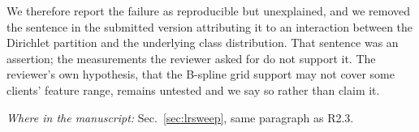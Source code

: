 \documentclass[11pt]{article}
\newcommand{\where}[1]{\par\smallskip\noindent\emph{Where in the manuscript:} #1\par}
\begin{document}
We therefore report the failure as reproducible but unexplained, and we removed the sentence in
the submitted version attributing it to an interaction between the Dirichlet partition and the
underlying class distribution. That sentence was an assertion; the measurements the reviewer asked
for do not support it. The reviewer's own hypothesis, that the B-spline grid support may not cover
some clients' feature range, remains untested and we say so rather than claim it.
\where{Sec.~\ref{sec:lrsweep}, same paragraph as R2.3.}
\end{document}
